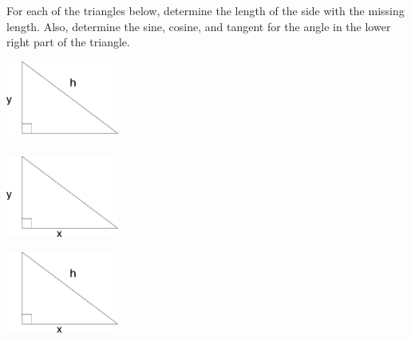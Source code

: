 \begin{problem}
\item For each of the triangles below, determine the length of the
  side with the missing length. Also, determine the sine, cosine, and tangent
    for the angle in the lower right part of the triangle.
  \begin{subproblem}
  \item \includegraphics[width=10em]{ink/trigSubs/triangleSymbolsLeftHyp}
    \vfill
  \item \includegraphics[width=10em]{ink/trigSubs/triangleSymbolsBottomLeft}
    \vfill
  \item \includegraphics[width=10em]{ink/trigSubs/triangleSymbolsBottomHyp}
    \vfill
  \end{subproblem}
\end{problem}



